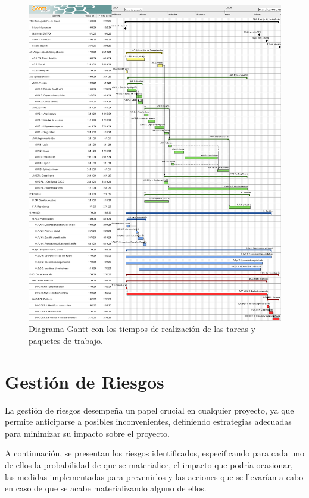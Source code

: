 \begin{figure}[H]
    \centering
    \includegraphics[width=\textwidth]{figures/gantt.png}
    \caption{Diagrama Gantt con los tiempos de realización de las tareas y paquetes de trabajo.}
    \label{fig:gantt}
\end{figure}

\section{Gestión de Riesgos}

La gestión de riesgos desempeña un papel crucial en cualquier proyecto, ya que permite anticiparse a posibles inconvenientes, definiendo estrategias adecuadas para minimizar su impacto sobre el proyecto.

A continuación, se presentan los riesgos identificados, especificando para cada uno de ellos la probabilidad de que se materialice, el impacto que podría ocasionar, las medidas implementadas para prevenirlos y las acciones que se llevarían a cabo en caso de que se acabe materializando alguno de ellos.

